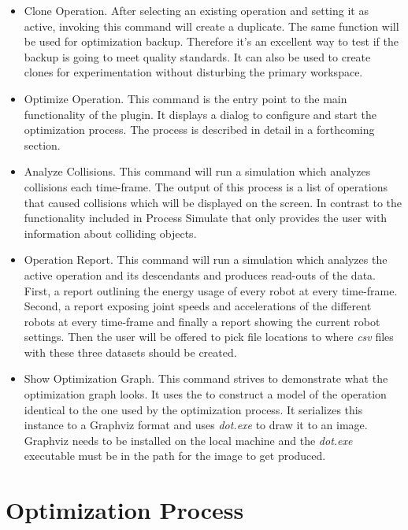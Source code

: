 \begin{itemize}
    \item Clone Operation. After selecting an existing operation and setting it as active, invoking this command will create a duplicate. The same function will be used for optimization backup. Therefore it's an excellent way to test if the backup is going to meet quality standards. It can also be used to create clones for experimentation without disturbing the primary workspace.
    
    \item Optimize Operation. This command is the entry point to the main functionality of the plugin. It displays a dialog to configure and start the optimization process. The process is described in detail in a forthcoming section. 
    
    \item Analyze Collisions. This command will run a simulation which analyzes collisions each time-frame. The output of this process is a list of operations that caused collisions which will be displayed on the screen. In contrast to the functionality included in Process Simulate that only provides the user with information about colliding objects.
    
    \item Operation Report.  This command will run a simulation which analyzes the active operation and its descendants and produces read-outs of the data. First, a report outlining the energy usage of every robot at every time-frame. Second, a report exposing joint speeds and accelerations of the different robots at every time-frame and finally a report showing the current robot settings. Then the user will be offered to pick file locations to where \emph{csv} files with these three datasets should be created.

    \item Show Optimization Graph. This command strives to demonstrate what the optimization graph looks. It uses the  to construct a model of the operation identical to the one used by the optimization process. It serializes this instance to a Graphviz format and uses \emph{dot.exe} to draw it to an image. Graphviz \cite{Graphviz} needs to be installed on the local machine and the \emph{dot.exe} executable must be in the path for the image to get produced.
        
\end{itemize}

\section{Optimization Process}

